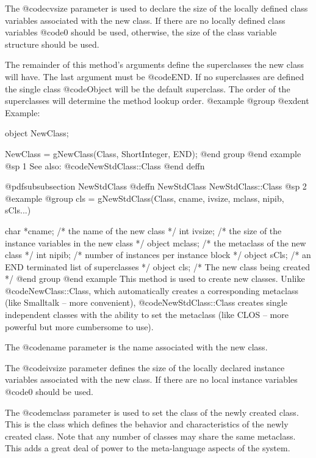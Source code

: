 The @code{cvsize} parameter is used to declare the size of the locally
defined class variables associated with the new class.  If there are no
locally defined class variables @code{0} should be used, otherwise, the
size of the class variable structure should be used.

The remainder of this method's arguments define the superclasses the new
class will have.  The last argument must be @code{END}.  If no superclasses
are defined the single class @code{Object} will be the default
superclass.  The order of the superclasses will determine the method
lookup order.
@example
@group
@exdent Example:

object  NewClass;

NewClass = gNewClass(Class, ShortInteger, END);
@end group
@end example
@sp 1
See also:  @code{NewStdClass::Class}
@end deffn





@pdfsubsubsection {NewStdClass}
@deffn {NewStdClass} NewStdClass::Class
@sp 2
@example
@group
cls = gNewStdClass(Class, cname, ivsize, mclass, nipib,
                   sCls...)

char    *cname; /*  the name of the new class    */
int     ivsize; /*  the size of the instance variables in 
                    the new class  */
object  mclass; /*  the metaclass of the new class  */
int     nipib;  /*  number of instances per instance block  */
object  sCls;   /*  an END terminated list of 
                           superclasses  */
object  cls;    /*  The new class being created  */
@end group
@end example
This method is used to create new classes.  Unlike @code{NewClass::Class},
which automatically creates a corresponding metaclass (like Smalltalk
-- more convenient), @code{NewStdClass::Class} creates single independent
classes with the ability to set the metaclass (like CLOS -- more
powerful but more cumbersome to use).

The @code{name} parameter is the name associated with the new class.

The @code{ivsize} parameter defines the size of the locally
declared instance variables associated with the new class.  If there are
no local instance variables @code{0} should be used.  

The @code{mclass} parameter is used to set the class of the newly
created class.  This is the class which defines the behavior and
characteristics of the newly created class.  Note that any number
of classes may share the same metaclass.  This adds a great deal
of power to the meta-language aspects of the system.

